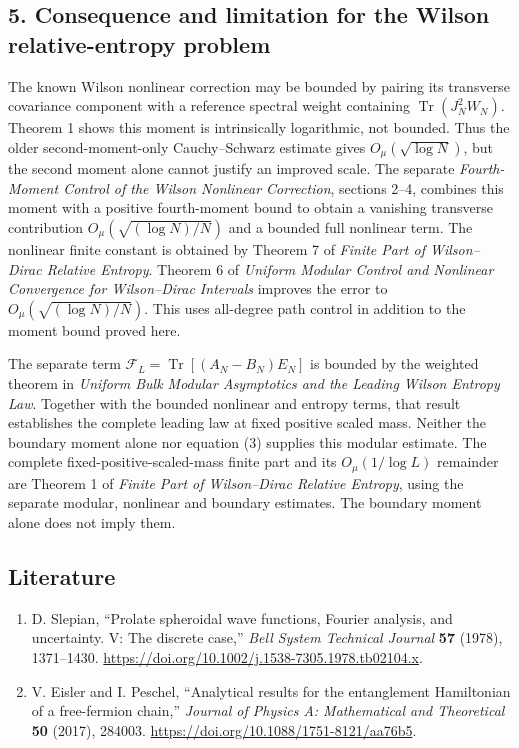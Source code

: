 \documentclass[
  10pt,
  a4paper,
]{article}
\providecommand{\tightlist}{%
  \setlength{\itemsep}{0pt}\setlength{\parskip}{0pt}}
\begin{document}
\subsection{5. Consequence and limitation for the Wilson relative-entropy problem}\label{consequence-and-limitation-for-the-wilson-relative-entropy-problem}

The known Wilson nonlinear correction may be bounded by pairing its transverse covariance component with a reference spectral weight containing \(\operatorname{Tr}(J_N^2W_N)\). Theorem 1 shows this moment is intrinsically logarithmic, not bounded. Thus the older second-moment-only Cauchy--Schwarz estimate gives \(O_\mu(\sqrt{\log N})\), but the second moment alone cannot justify an improved scale. The separate \emph{Fourth-Moment Control of the Wilson Nonlinear Correction}, sections 2--4, combines this moment with a positive fourth-moment bound to obtain a vanishing transverse contribution \(O_\mu(\sqrt{(\log N)/N})\) and a bounded full nonlinear term. The nonlinear finite constant is obtained by Theorem 7 of \emph{Finite Part of Wilson--Dirac Relative Entropy}. Theorem 6 of \emph{Uniform Modular Control and Nonlinear Convergence for Wilson--Dirac Intervals} improves the error to \(O_\mu(\sqrt{(\log N)/N})\). This uses all-degree path control in addition to the moment bound proved here.

The separate term \(\mathcal F_L=\operatorname{Tr}[(A_N-B_N)E_N]\) is bounded by the weighted theorem in \emph{Uniform Bulk Modular Asymptotics and the Leading Wilson Entropy Law}. Together with the bounded nonlinear and entropy terms, that result establishes the complete leading law at fixed positive scaled mass. Neither the boundary moment alone nor equation (3) supplies this modular estimate. The complete fixed-positive-scaled-mass finite part and its \(O_\mu(1/\log L)\) remainder are Theorem 1 of \emph{Finite Part of Wilson--Dirac Relative Entropy}, using the separate modular, nonlinear and boundary estimates. The boundary moment alone does not imply them.

\subsection{Literature}\label{literature}

\begin{enumerate}
\def\labelenumi{\arabic{enumi}.}
\tightlist
\item
  D. Slepian, ``Prolate spheroidal wave functions, Fourier analysis, and uncertainty. V: The discrete case,'' \emph{Bell System Technical Journal} \textbf{57} (1978), 1371--1430. \url{https://doi.org/10.1002/j.1538-7305.1978.tb02104.x}.
\item
  V. Eisler and I. Peschel, ``Analytical results for the entanglement Hamiltonian of a free-fermion chain,'' \emph{Journal of Physics A: Mathematical and Theoretical} \textbf{50} (2017), 284003. \url{https://doi.org/10.1088/1751-8121/aa76b5}.
\end{enumerate}
\end{document}
